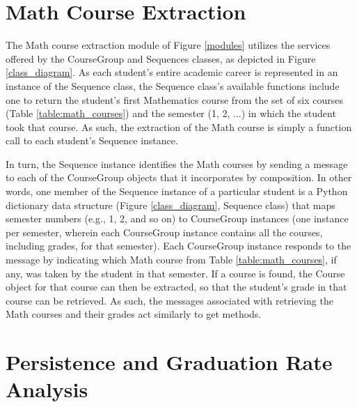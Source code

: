 \section{Math Course Extraction}

The Math course extraction module of Figure \ref{modules} utilizes the services offered by the CourseGroup and Sequences classes, as depicted in Figure \ref{class_diagram}.  As each student's entire academic career is represented in an instance of the Sequence class, the Sequence class's available functions include one to return the student's first Mathematics course from the set of six courses (Table \ref{table:math_courses}) and the semester (1, 2, ...) in which the student took that course.  As such, the extraction of the Math course is simply a function call to each student's Sequence instance.    

In turn, the Sequence instance identifies the Math courses by sending a message to each of the CourseGroup objects that it incorporates by composition.  In other words, one member of the Sequence instance of a particular student is a Python dictionary data structure (Figure \ref{class_diagram}, Sequence class) that maps semester numbers (e.g., 1, 2, and so on) to CourseGroup instances (one instance per semester, wherein each CourseGroup instance contains all the courses, including grades, for that semester).  Each CourseGroup instance responds to the message by indicating which Math course from Table \ref{table:math_courses}, if any, was taken by the student in that semester.  If a course is found, the Course object for that course can then be extracted, so that the student's grade in that course can be retrieved.  As such, the messages associated with retrieving the Math courses and their grades act similarly to get methods.  

\section{Persistence and Graduation Rate Analysis}

